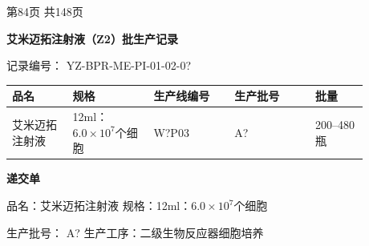\documentclass[UTF8,10pt,a4paper,fontset=fandol]{ctexart}
\newcommand{\fieldvalue}[1]{#1}
\newcommand{\handwritten}[1]{#1}
\begin{document}
\vfill

\begin{center}
第84页 共148页
\end{center}

\newpage

\begin{center}
\textbf{艾米迈拓注射液（Z2）批生产记录}
\end{center}

记录编号：
\fieldvalue{YZ-BPR-ME-PI-01-02-0?}

\begin{center}
\begin{tabular}{|p{0.15\linewidth}|p{0.20\linewidth}|p{0.20\linewidth}|p{0.20\linewidth}|p{0.13\linewidth}|}
\hline
品名 & 规格 & 生产线编号 & 生产批号 & 批量 \\
\hline
艾米迈拓注射液 &
12ml：$6.0\times10^{7}$个细胞 &
\fieldvalue{\handwritten{W?P03}} &
\fieldvalue{\handwritten{A?}} &
200--480 瓶 \\
\hline
\end{tabular}
\end{center}

\begin{center}
\textbf{递交单}
\end{center}

\noindent
品名：艾米迈拓注射液
\hfill
规格：12ml：$6.0\times10^{7}$个细胞

\noindent
生产批号：
\fieldvalue{\handwritten{A?}}
\hfill
生产工序：二级生物反应器细胞培养

\vspace{0.5em}
\end{document}
